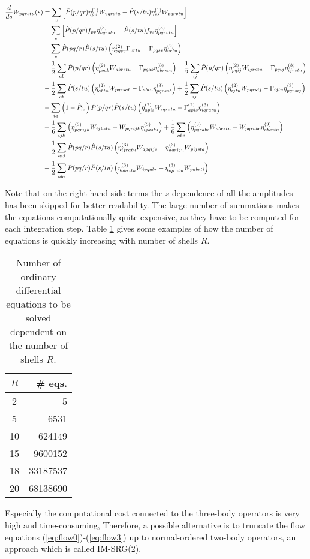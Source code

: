\begin{align}
\frac{d}{ds} W_{pqrstu}(s) &= \sum_v \left[ \hat{P}(p/qr)\eta_{pv}^{(1)} W_{vqrstu} - \hat{P}(s/tu) \eta_{vs}^{(1)} W_{pqrvtu} \right] \notag \\
& - \sum_v \left[ \hat{P}(p/qr)f_{pv} \eta_{vqrstu}^{(3)} - \hat{P}(s/tu) f_{vs} \eta_{pqrvtu}^{(3)} \right] \notag \\
& + \sum_v \hat{P}(pq/r) \hat{P}(s/tu) \lb \eta_{pqsv}^{(2)} \Gamma_{vrtu} - \Gamma_{pqsv} \eta_{vrtu}^{(2)} \rb\notag \\
& + \frac{1}{2} \sum_{ab} \hat{P}(p/qr) \lb \eta_{pqab}^{(2)} W_{abrstu} - \Gamma_{pqab} \eta_{abrstu}^{(3)}\rb
-  \frac{1}{2} \sum_{ij} \hat{P}(p/qr) \lb \eta_{pqij}^{(2)} W_{ijrstu} - \Gamma_{pqij} \eta_{ijrstu}^{(3)}\rb \notag \\
& - \frac{1}{2} \sum_{ab} \hat{P}(s/tu) \lb \eta_{abtu}^{(2)} W_{pqrsab} - \Gamma_{abtu} \eta_{pqrsab}^{(3)}\rb
+  \frac{1}{2} \sum_{ij} \hat{P}(s/tu) \lb \eta_{ijtu}^{(2)} W_{pqrsij} - \Gamma_{ijtu} \eta_{pqrsij}^{(3)}\rb \notag \\
& - \sum_{ia} \lb 1-\hat{P}_{ia}\rb \hat{P}(p/qr)\hat{P}(s/tu)  \lb \eta_{apis}^{(2)} W_{iqratu} - \Gamma_{apis}^{(2)} \eta^{(3)}_{iqratu}\rb \notag \\
& + \frac{1}{6}\sum_{ijk} \lb \eta_{pqrijk}^{(3)} W_{ijkstu} - W_{pqrijk} \eta_{ijkstu}^{(3)} \rb + 
\frac{1}{6}\sum_{abc} \lb \eta_{pqrabc}^{(3)} W_{abcstu} - W_{pqrabc} \eta_{abcstu}^{(3)} \rb \notag \\
& + \frac{1}{2}\sum_{aij} \hat{P}(pq/r) \hat{P}(s/tu) \lb \eta_{ijratu}^{(3)} W_{apqijs} - \eta_{aqriju}^{(3)} W_{pijsta} \rb \notag \\
& + \frac{1}{2}\sum_{abi} \hat{P}(pq/r) \hat{P}(s/tu) \lb \eta_{abritu}^{(3)} W_{ipqabs} - \eta_{iqrabu}^{(3)} W_{pabsti} \rb
\label{eq:flow3}
	\end{align}

Note that on the right-hand side terms the $s$-dependence of all the amplitudes has been skipped for better readability. 
The large number of summations makes the equations computationally quite expensive, as they have to be computed for each integration step. Table \ref{tab:numeqs} gives some examples of how the number of equations is quickly increasing with number of shells $R$.

\begin{table}
\begin{center}
\begin{tabular}{cr}
\hline\hline
 $R$ & \# eqs. \\
 \hline
 2 & 5 \\
 5  & 6531   \\
10& 624149 \\
15& 9600152 \\
18& 33187537 \\
20& 68138690 \\
\hline\hline
\end{tabular}
\end{center}
\caption{Number of ordinary differential equations to be solved dependent on the number of shells $R$.}
\label{tab:numeqs}
\end{table}

Especially the computational cost connected to the three-body operators is very high and time-consuming, Therefore, a possible alternative is to truncate the flow equations (\ref{eq:flow0})-(\ref{eq:flow3}) up to normal-ordered two-body operators, an approach which is called IM-SRG(2).




